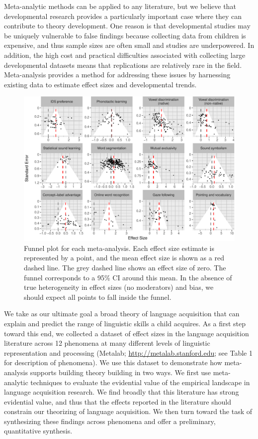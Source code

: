 \documentclass[9pt,twocolumn,twoside,lineno]{pnas-new}
\begin{document}
Meta-analytic methods can be applied to any literature, but we believe
that developmental research provides a particularly important case where
they can contribute to theory development. One reason is that
developmental studies may be uniquely vulnerable to false findings
because collecting data from children is expensive, and thus sample
sizes are often small and studies are underpowered. In addition, the
high cost and practical difficulties associated with collecting large
developmental datasets means that replications are relatively rare in
the field. Meta-analysis provides a method for addressing these issues
by harnessing existing data to estimate effect sizes and developmental
trends.

\begin{figure}[t!]
\centering
\includegraphics[width=17.3cm]{figs/unnamed-chunk-2-1.pdf}
\caption{Funnel plot for each meta-analysis. Each effect size estimate
is represented by a point, and the mean effect size is shown as a red
dashed line. The grey dashed line shows an effect size of zero. The
funnel corresponds to a 95\% CI around this mean. In the absence of true
heterogeneity in effect sizes (no moderators) and bias, we should expect
all points to fall inside the funnel.}
\end{figure}


We take as our ultimate goal a broad theory of language acquisition that
can explain and predict the range of linguistic skills a child acquires.
As a first step toward this end, we collected a dataset of effect sizes
in the language acquisition literature across 12 phenomena  at many different levels of linguistic
representation and processing (Metalab;
\url{http://metalab.stanford.edu}; see Table 1 for description of phenomena). 
We use this dataset to demonstrate
how meta-analysis supports building  theory building in two ways. We first
use meta-analytic techniques to evaluate the evidential value of the
empirical landscape in language acquisition research. We find broadly
that this literature has strong evidential value, and thus that the
effects reported in the literature should constrain our theorizing of
language acquisition. We then turn toward the task of synthesizing these
findings across phenomena and offer a preliminary, quantitative
synthesis.
\end{document}

